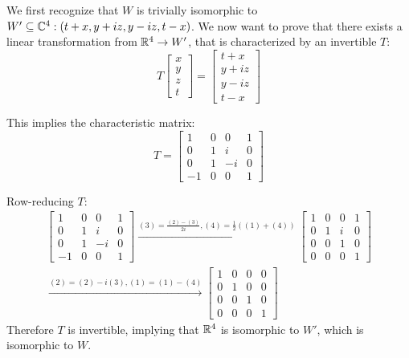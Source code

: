 \documentclass[a4paper, 10pt]{article}
\begin{document}
\begin{solution}
    We first recognize that \(W\) is trivially isomorphic to \(W'\subseteq \mathbb{C}^4: (t+x, y+iz, y-iz, t-x)\). We now want to prove that there exists a linear transformation from \(\mathbb{R}^4 \to W'\), that is characterized by an invertible \(T\): \[
    T \left[\begin{array}{c}
    x \\ y \\ z \\ t
    \end{array}\right] = \left[\begin{array}{c}
    t+x \\
    y+iz \\
    y-iz \\
    t-x
    \end{array}\right]
    \]

    This implies the characteristic matrix: \[
    T = \left[\begin{array}{cccc}
    1 & 0 & 0 & 1 \\
    0 & 1 & i & 0 \\
    0 & 1 & -i & 0 \\
    -1 & 0 & 0 & 1
    \end{array}\right]
    \]

    Row-reducing \(T\):
    \begin{multline*}
        \left[\begin{array}{cccc}
            1 & 0 & 0 & 1 \\
            0 & 1 & i & 0 \\
            0 & 1 & -i & 0 \\
            -1 & 0 & 0 & 1
            \end{array}\right] \xrightarrow{(3) = \frac{(2)-(3)}{2i}, (4) = \frac{1}{2} ((1) + (4))} \left[\begin{array}{cccc}
                1 & 0 & 0 & 1 \\
                0 & 1 & i & 0 \\
                0 & 0 & 1 & 0 \\
                0 & 0 & 0 & 1
            \end{array}\right]
            \\
            \xrightarrow{(2) = (2) - i(3), (1) = (1) - (4)} \left[\begin{array}{cccc}
                1 & 0 & 0 & 0 \\
                0 & 1 & 0 & 0 \\
                0 & 0 & 1 & 0 \\
                0 & 0 & 0 & 1
            \end{array}\right]
    \end{multline*}
    Therefore \(T\) is invertible, implying that \(\mathbb{R}^4\) is isomorphic to \(W'\), which is isomorphic to \(W\).
\end{solution}
\end{document}
